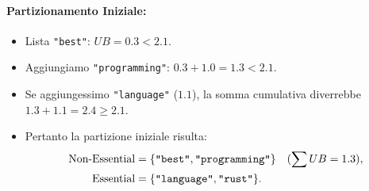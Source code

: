 \paragraph{Partizionamento Iniziale:}
\begin{itemize}
    \item Lista \texttt{"best"}: $UB = 0.3 < 2.1$.
    \item Aggiungiamo \texttt{"programming"}: $0.3 + 1.0 = 1.3 < 2.1$.
    \item Se aggiungessimo \texttt{"language"} ($1.1$), la somma cumulativa diverrebbe $1.3 + 1.1 = 2.4 \ge 2.1$.
    \item Pertanto la partizione iniziale risulta:
    \begin{align*}
        \text{Non-Essential} &= \{\text{\texttt{"best"}}, \text{\texttt{"programming"}}\} \quad (\sum UB = 1.3), \\
        \text{Essential} &= \{\text{\texttt{"language"}}, \text{\texttt{"rust"}}\}.
    \end{align*}
\end{itemize}

